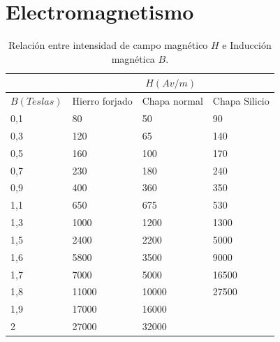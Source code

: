 \documentclass[../main]{subfiles}
\begin{document}
\chapter{Electromagnetismo}
\begin{table}[ht]
  \caption{Relación entre intensidad de campo magnético $H$ e
  Inducción magnética $B$.}
  \begin{center}
    \begin{tabular}[c]{|p{2cm}|p{3cm}|p{3cm}|p{3cm}|}
      \hline
      & \multicolumn{3}{|c|}{$H(Av/m)$} \\
      \hline
      {$B(Teslas)$} & Hierro forjado & Chapa normal & Chapa Silicio \\
      \hline
      0,1 & 80 & 50 & 90 \\
      0,3 & 120 & 65&140 \\
      0,5&160&100&170\\
      0,7&230&180&240\\
      0,9&400&360&350\\
      1,1&650&675&530\\
      1,3&1000&1200&1300\\
      1,5&2400&2200&5000\\
      1,6&5800&3500&9000\\
      1,7&7000&5000&16500\\
      1,8&11000&10000&27500\\
      1,9&17000&16000&\\
      2&27000&32000&\\
      \hline
    \end{tabular}
  \end{center}
\end{table}
\end{document}
